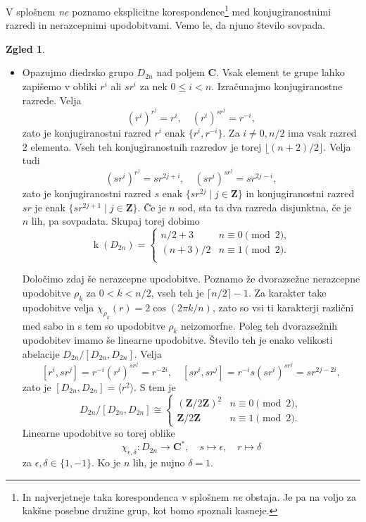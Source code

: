\documentclass[11pt]{book}
\def\ZZ{\mathbf{Z}}
\def\CC{\mathbf{C}}
\DeclareMathOperator\kk{k}
\theoremstyle{definition}
\theoremstyle{zgled}
\newtheorem*{zgled}{Zgled}
\theoremstyle{odprtproblem}
\theoremstyle{domacanaloga}
\theoremstyle{izrek}
\begin{document}
V splošnem \emph{ne} poznamo eksplicitne korespondence\footnote{In najverjetneje taka korespondenca v splošnem \emph{ne} obstaja. Je pa na voljo za kakšne posebne družine grup, kot bomo spoznali kasneje.}  med konjugiranostnimi razredi in nerazcepnimi upodobitvami. Vemo le, da njuno število sovpada.

\begin{zgled} \leavevmode
\begin{itemize}
\item Opazujmo diedrsko grupo $D_{2n}$ nad poljem $\CC$. Vsak element te grupe lahko zapišemo v obliki $r^i$ ali $s r^i$ za nek $0 \leq i < n$. Izračunajmo konjugiranostne razrede. Velja
\[
    \left( r^i \right)^{r^j} = r^i, \quad
    \left( r^i \right)^{s r^j} = r^{-i},
\]
zato je konjugiranostni razred $r^i$ enak $\{ r^{i}, r^{-i} \}$. Za $i \neq 0, n/2$ ima vsak razred $2$ elementa. Vseh teh konjugiranostnih razredov je torej $\lfloor (n+2)/2 \rfloor$.
Velja tudi
\[
    \left( s r^i \right)^{r^j} = s r^{2j + i}, \quad
    \left( s r^i \right)^{s r^j} = s r^{2j - i},   
\]
zato je konjugiranostni razred $s$ enak $\{ s r^{2j} \mid j \in \ZZ \}$ in konjugiranostni razred $sr$ je enak $\{ s r^{2j + 1} \mid j \in \ZZ \}$. Če je $n$ sod, sta ta dva razreda disjunktna, če je $n$ lih, pa sovpadata. Skupaj torej dobimo
\[
    \kk(D_{2n}) = \begin{cases}
        n/2 + 3 & n \equiv 0 \pmod{2}, \\
        (n+3)/2 & n \equiv 1 \pmod{2}. \\
    \end{cases}
\]

Določimo zdaj še nerazcepne upodobitve. Poznamo že dvorazsežne nerazcepne upodobitve $\rho_k$ za $0 < k < n/2$, vseh teh je $\lceil n/2 \rceil - 1$. Za karakter take upodobitve velja $\chi_{\rho_k}(r) = 2 \cos(2 \pi k / n)$, zato so vsi ti karakterji različni med sabo in s tem so upodobitve $\rho_k$ neizomorfne. Poleg teh dvorazsežnih upodobitev imamo še linearne upodobitve. Število teh je enako velikosti abelacije $D_{2n}/[D_{2n}, D_{2n}]$. Velja
\[
    [r^i, s r^j] = r^{-i} \left( r^i \right)^{s r^j} = r^{-2i}, \quad
    [s r^i, s r^j] = r^{-i} s \left( s r^i \right)^{s r^j} = s r^{2j - 2i},
\]
zato je $[D_{2n}, D_{2n}] = \langle r^2 \rangle$. S tem je 
\[
    D_{2n}/[D_{2n}, D_{2n}] \cong \begin{cases}
        (\ZZ/2\ZZ)^2 & n \equiv 0 \pmod{2}, \\
        \ZZ/2\ZZ & n \equiv 1 \pmod{2}.
    \end{cases}
\]
Linearne upodobitve so torej oblike
\[
    \chi_{\epsilon, \delta} \colon D_{2n} \to \CC^*, \quad
    s \mapsto \epsilon, \quad
    r \mapsto \delta
\]
za $\epsilon, \delta \in \{ 1, -1 \}$. Ko je $n$ lih, je nujno $\delta = 1$.


\end{itemize}
\end{zgled}
\end{document}
